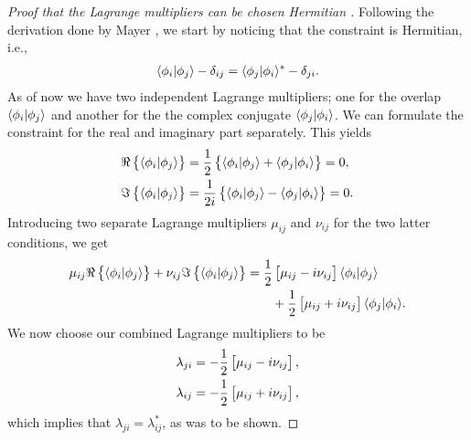         \begin{proof}[%
                Proof that the Lagrange multipliers can be chosen Hermitian%
            ]
            Following the derivation done by Mayer \cite{mayer2003simple}, we
            start by noticing that the constraint is Hermitian, i.e.,
            \begin{align}
                \langle \phi_i | \phi_j \rangle - \delta_{ij}
                = \langle \phi_j | \phi_i \rangle^{*} - \delta_{ji}.
            \end{align}
            As of now we have two independent Lagrange multipliers; one for the
            overlap $\langle \phi_i | \phi_j \rangle$ and another for the the complex
            conjugate $\langle \phi_j | \phi_i \rangle$.
            We can formulate the constraint for the real and imaginary part
            separately.
            This yields
            \begin{align}
                \Re\left\{ 
                    \langle \phi_i | \phi_j \rangle
                 \right\}
                &=
                \frac{1}{2}\left\{ 
                    \langle \phi_i | \phi_j \rangle
                    + \langle \phi_j | \phi_i \rangle
                 \right\}
                = 0,
                \\
                \Im\left\{ 
                    \langle \phi_i | \phi_j \rangle
                 \right\}
                &=
                \frac{1}{2i}\left\{ 
                    \langle \phi_i | \phi_j \rangle
                    - \langle \phi_j | \phi_i \rangle
                 \right\}
                = 0.
            \end{align}
            Introducing two separate Lagrange multipliers $\mu_{ij}$ and
            $\nu_{ij}$ for the two latter conditions, we get
            \begin{align}
                \mu_{ij}\Re\left\{ 
                    \langle \phi_i | \phi_j \rangle
                 \right\}
                + \nu_{ij}\Im\left\{ 
                    \langle \phi_i | \phi_j \rangle
                 \right\}
                &=
                \frac{1}{2}\left[ 
                    \mu_{ij} - i\nu_{ij}
                 \right]
                \langle \phi_i | \phi_j \rangle
                \nonumber
                \\
                &\qquad
                + \frac{1}{2}\left[ 
                    \mu_{ij} + i\nu_{ij}
                 \right]
                \langle \phi_j | \phi_i \rangle.
            \end{align}
            We now choose our combined Lagrange multipliers to be
            \begin{align}
                \lambda_{ji} &=
                -\frac{1}{2}\left[ 
                    \mu_{ij} - i\nu_{ij}
                 \right], \\
                \lambda_{ij} &=
                -\frac{1}{2}\left[ 
                    \mu_{ij} + i\nu_{ij}
                 \right],
            \end{align}
            which implies that $\lambda_{ji} = \lambda_{ij}^{*}$, as was to be
            shown.
        \end{proof}
